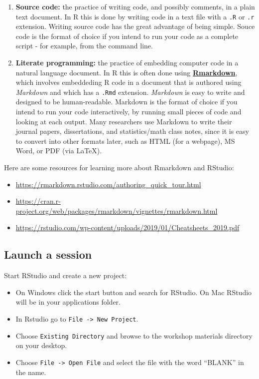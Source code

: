 \documentclass[
]{book}
\providecommand{\tightlist}{%
  \setlength{\itemsep}{0pt}\setlength{\parskip}{0pt}}
\begin{document}
\begin{enumerate}
\def\labelenumi{\arabic{enumi}.}
\item
  \textbf{Source code:} the practice of writing code, and possibly comments, in a plain text document. In R this is done by writing code in a text file with a \texttt{.R} or \texttt{.r} extension. Writing source code has the great advantage of being simple. Souce code is the format of choice if you intend to run your code as a complete script - for example, from the command line.
\item
  \textbf{Literate programming:} the practice of embedding computer code in a natural language document. In R this is often done using \href{https://rmarkdown.rstudio.com/}{\textbf{Rmarkdown}}, which involves embeddeding R code in a document that is authored using \emph{Markdown} and which has a \texttt{.Rmd} extension. \emph{Markdown} is easy to write and designed to be human-readable. Markdown is the format of choice if you intend to run your code interactively, by running small pieces of code and looking at each output. Many researchers use Markdown to write their journal papers, dissertations, and statistics/math class notes, since it is easy to convert into other formats later, such as HTML (for a webpage), MS Word, or PDF (via LaTeX).
\end{enumerate}

Here are some resources for learning more about Rmarkdown and RStudio:

\begin{itemize}
\tightlist
\item
  \url{https://rmarkdown.rstudio.com/authoring_quick_tour.html}
\item
  \url{https://cran.r-project.org/web/packages/rmarkdown/vignettes/rmarkdown.html}
\item
  \url{https://rstudio.com/wp-content/uploads/2019/01/Cheatsheets_2019.pdf}
\end{itemize}

\hypertarget{launch-a-session}{%
\subsection{Launch a session}\label{launch-a-session}}

Start RStudio and create a new project:

\begin{itemize}
\tightlist
\item
  On Windows click the start button and search for RStudio. On Mac
  RStudio will be in your applications folder.
\item
  In Rstudio go to \texttt{File\ -\textgreater{}\ New\ Project}.
\item
  Choose \texttt{Existing\ Directory} and browse to the workshop materials directory on your desktop.
\item
  Choose \texttt{File\ -\textgreater{}\ Open\ File} and select the file with the word ``BLANK'' in the name.
\end{itemize}
\end{document}

